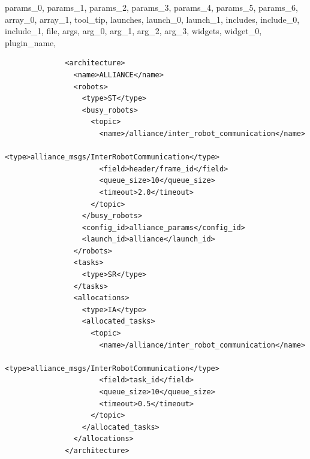 {{                                    params_0,
                                    params_1,
                                    params_2,
                                    params_3,
                                    params_4,
                                    params_5,
                                    params_6,
                                    array_0,
                                    array_1,
                                        tool_tip,
                            launches,
                                launch_0,
                                launch_1,
                                includes,
                                    include_0,
                                    include_1,
                                        file,
                                        args,
                                            arg_0,
                                            arg_1,
                                            arg_2,
                                            arg_3,
                            widgets,
                                widget_0,
                                    plugin_name,
                }
            }
            
            \begin{lstlisting}
              <architecture>
                <name>ALLIANCE</name>
                <robots>
                  <type>ST</type>
                  <busy_robots>
                    <topic>
                      <name>/alliance/inter_robot_communication</name>
                      <type>alliance_msgs/InterRobotCommunication</type>
                      <field>header/frame_id</field>
                      <queue_size>10</queue_size>
                      <timeout>2.0</timeout>
                    </topic>
                  </busy_robots>
                  <config_id>alliance_params</config_id>
                  <launch_id>alliance</launch_id>
                </robots>
                <tasks>
                  <type>SR</type>
                </tasks>
                <allocations>
                  <type>IA</type>
                  <allocated_tasks>
                    <topic>
                      <name>/alliance/inter_robot_communication</name>
                      <type>alliance_msgs/InterRobotCommunication</type>
                      <field>task_id</field>
                      <queue_size>10</queue_size>
                      <timeout>0.5</timeout>
                    </topic>
                  </allocated_tasks>
                </allocations>
              </architecture>
            \end{lstlisting}
            

